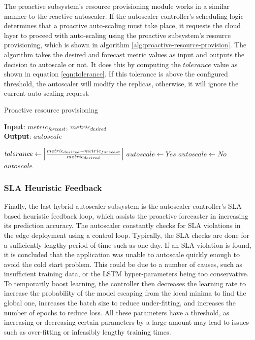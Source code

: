 The proactive subsystem's resource provisioning module works in a similar manner to the reactive autoscaler. If the autoscaler controller's scheduling logic determines that a proactive auto-scaling must take place, it requests the cloud layer to proceed with auto-scaling using the proactive subsystem's resource provisioning, which is shown in algorithm \ref{alg:proactive-resource-provision}. The algorithm takes the desired and forecast metric values as input and outputs the decision to autoscale or not. It does this by computing the $tolerance$ value as shown in equation \ref{eqn:tolerance}. If this tolerance is above the configured threshold, the autoscaler will modify the replicas, otherwise, it will ignore the current auto-scaling request.\par

\begin{algorithm}
    \caption{Proactive resource provisioning}
    \label{alg:proactive-resource-provision}
    \textbf{Input}: $metric_{forecast},\, metric_{desired}$\\
    \textbf{Output}: $autoscale$
    \begin{algorithmic}
        \State $tolerance \gets \abs{ \frac{metric_{desired} - metric_{forecast}}{metric_{desired}} }$
            \State $autoscale \gets Yes$
        \Else
            \State $autoscale \gets No$
        \EndIf
        \State \Return $autoscale$
    \end{algorithmic}
\end{algorithm}

\subsubsection{SLA Heuristic Feedback}

Finally, the last hybrid autoscaler subsystem is the autoscaler controller's SLA-based heuristic feedback loop, which assists the proactive forecaster in increasing its prediction accuracy. The autoscaler constantly checks for SLA violations in the edge deployment using a control loop. Typically, the SLA checks are done for a sufficiently lengthy period of time such as one day. If an SLA violation is found, it is concluded that the application was unable to autoscale quickly enough to avoid the cold start problem. This could be due to a number of causes, such as insufficient training data, or the LSTM hyper-parameters being too conservative. To temporarily boost learning, the controller then decreases the learning rate to increase the probability of the model escaping from the local minima to find the global one, increases the batch size to reduce under-fitting, and increases the number of epochs to reduce loss. All these parameters have a threshold, as increasing or decreasing certain parameters by a large amount may lead to issues such as over-fitting or infeasibly lengthy training times.\par

